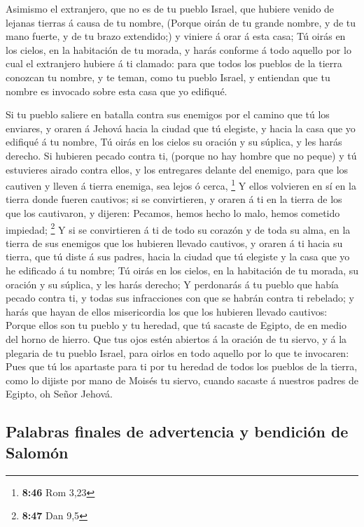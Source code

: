  Asimismo el extranjero, que no es de tu pueblo Israel,
que hubiere venido de lejanas tierras á causa de tu nombre,
 (Porque oirán de tu grande nombre, y de tu mano fuerte,
y de tu brazo extendido;) y viniere á orar á esta casa; 
Tú oirás en los cielos, en la habitación de tu morada, y harás conforme
á todo aquello por lo cual el extranjero hubiere á ti clamado: para que
todos los pueblos de la tierra conozcan tu nombre, y te teman, como tu
pueblo Israel, y entiendan que tu nombre es invocado sobre esta casa que
yo edifiqué.

 Si tu pueblo saliere en batalla contra sus enemigos por
el camino que tú los enviares, y oraren á Jehová hacia la ciudad que tú
elegiste, y hacia la casa que yo edifiqué á tu nombre, 
Tú oirás en los cielos su oración y su súplica, y les harás derecho.
 Si hubieren pecado contra ti, (porque no hay hombre que
no peque) y tú estuvieres airado contra ellos, y los entregares delante
del enemigo, para que los cautiven y lleven á tierra enemiga, sea lejos
ó cerca, \footnote{\textbf{8:46} Rom 3,23}  Y ellos
volvieren en sí en la tierra donde fueren cautivos; si se convirtieren,
y oraren á ti en la tierra de los que los cautivaron, y dijeren:
Pecamos, hemos hecho lo malo, hemos cometido impiedad; \footnote{\textbf{8:47}
  Dan 9,5}  Y si se convirtieren á ti de todo su corazón
y de toda su alma, en la tierra de sus enemigos que los hubieren llevado
cautivos, y oraren á ti hacia su tierra, que tú diste á sus padres,
hacia la ciudad que tú elegiste y la casa que yo he edificado á tu
nombre;  Tú oirás en los cielos, en la habitación de tu
morada, su oración y su súplica, y les harás derecho;  Y
perdonarás á tu pueblo que había pecado contra ti, y todas sus
infracciones con que se habrán contra ti rebelado; y harás que hayan de
ellos misericordia los que los hubieren llevado cautivos:
 Porque ellos son tu pueblo y tu heredad, que tú sacaste
de Egipto, de en medio del horno de hierro.  Que tus ojos
estén abiertos á la oración de tu siervo, y á la plegaria de tu pueblo
Israel, para oirlos en todo aquello por lo que te invocaren:
 Pues que tú los apartaste para ti por tu heredad de
todos los pueblos de la tierra, como lo dijiste por mano de Moisés tu
siervo, cuando sacaste á nuestros padres de Egipto, oh Señor Jehová.

\hypertarget{palabras-finales-de-advertencia-y-bendiciuxf3n-de-salomuxf3n}{%
\subsection{Palabras finales de advertencia y bendición de
Salomón}\label{palabras-finales-de-advertencia-y-bendiciuxf3n-de-salomuxf3n}}

